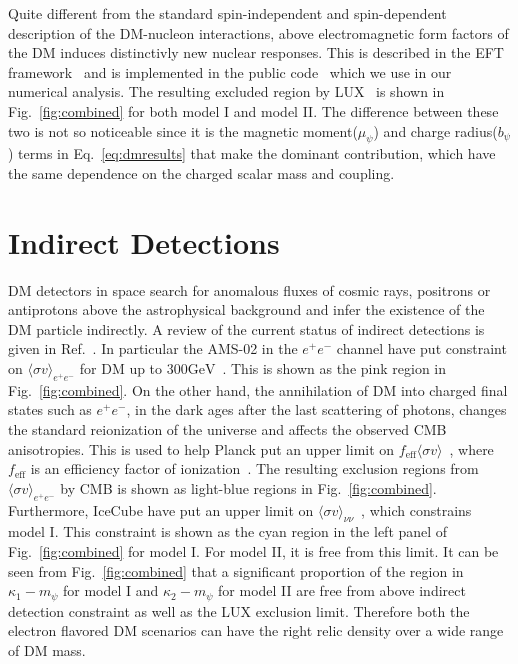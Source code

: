 \documentclass[aps,prd,letterpaper,showpacs,twocolumn,preprintnumbers,floatfix,superscriptaddress]{revtex4-1}
\begin{document}
Quite different from the standard spin-independent and spin-dependent description of the DM-nucleon 
interactions, above electromagnetic form factors of the DM induces distinctivly new nuclear responses. 
This is described in the EFT framework~\cite{Fan:2010gt,Fitzpatrick:2012ix,Anand:2013yka} and is implemented 
in the public code~\cite{DelNobile:2013sia} which we use in our numerical analysis. The resulting excluded 
region by LUX~\cite{Akerib:2016vxi} is shown in Fig.~\ref{fig:combined} for both model I and model II.
The difference between these two is not so noticeable since it is the magnetic moment($\mu_{\psi}$) and 
charge radius($b_{\psi}$) terms in Eq.~\ref{eq:dmresults} that make the dominant contribution, which have 
the same dependence on the charged scalar mass and coupling.






\section{Indirect Detections}
DM detectors in space search for anomalous fluxes of cosmic rays, positrons or antiprotons above the 
astrophysical background and infer the existence of the DM particle indirectly. A review of the current 
status of indirect detections is given in Ref.~\cite{Slatyer:2017sev}. 
%
In particular the 
AMS-02 in the $e^+ e^-$ channel have put constraint on $\langle \sigma v \rangle_{e^+ e^-}$ for DM up to $300\text{GeV}$~\cite{Bergstrom:2013jra}. 
%
This is shown as the 
pink region in Fig.~\ref{fig:combined}.
%
On the other hand, the annihilation of DM into charged final states such as $e^+ e^-$, in the dark ages after
the last scattering of photons, changes the standard reionization of the universe and affects the observed 
CMB anisotropies. 
%
This is used to help Planck put an upper limit on 
$f_{\text{eff}}\langle \sigma v \rangle$~\cite{Ade:2015xua}, 
where $f_{\text{eff}}$ is an efficiency factor of 
ionization~\cite{Finkbeiner:2011dx,Slatyer:2015jla,Slatyer:2015kla}. 
%
The resulting exclusion regions from 
$\langle \sigma v \rangle_{e^+ e^-}$ by CMB is shown as light-blue regions in Fig.~\ref{fig:combined}. 
%
Furthermore, IceCube have put an upper limit on $\langle \sigma v \rangle_{\nu \nu}$~\cite{Aartsen:2016pfc}, which constrains 
model I. 
%
This constraint is shown as the cyan region in the left panel of Fig.~\ref{fig:combined} for model I.
%
For model II, it is free from this limit. 
%
It can be seen from Fig.~\ref{fig:combined} that a significant 
proportion of the region in $\kappa_1 - m_{\psi}$ for model I and $\kappa_2 - m_{\psi}$ for model II are 
free from above indirect detection constraint as well as the LUX exclusion limit. 
%
Therefore both the electron
flavored DM scenarios can have the right relic density over a wide range of DM mass.
\end{document}
